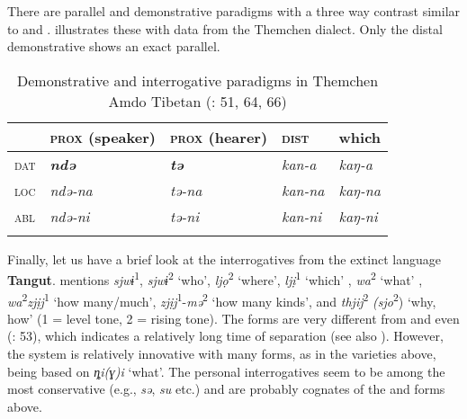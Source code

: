 There are parallel  and demonstrative paradigms with a three way contrast similar to  and .  illustrates these with data from the Themchen dialect. Only the distal demonstrative shows an exact parallel.

\begin{table}
\caption{Demonstrative and interrogative paradigms in Themchen Amdo Tibetan (\citealt{Haller2004}: 51, 64, 66)}
\label{tab:trans:13}

\begin{tabularx}{\textwidth}{XlXXl}
\lsptoprule
& \textbf{\textsc{prox}} \textbf{(speaker)} & \textbf{\textsc{prox}} \textbf{(hearer)} & \textbf{\textsc{dist}} & \textbf{which}\\
\midrule
\textsc{dat} & \textbf{\textit{ndə}} & \textbf{\textit{tə}} & \textit{kan-a} & \textit{kaŋ-a}\\
\textsc{loc} & \textit{ndə-na} & \textit{tə-na} & \textit{kan-na} & \textit{kaŋ-na}\\
\textsc{abl} & \textit{ndə-ni} & \textit{tə-ni} & \textit{kan-ni} & \textit{kaŋ-ni}\\
\lspbottomrule
\end{tabularx}
\end{table}

Finally, let us have a brief look at the interrogatives from the extinct language \textbf{Tangut}. \citet[617, passim]{Gong2003} mentions \textit{sjwɨ}\textsuperscript{1}, \textit{sjwɨ}\textsuperscript{2} ‘who’, \textit{ljọ}\textsuperscript{2} ‘where’, \textit{ljị}\textsuperscript{1} ‘which’ , \textit{wa}\textsuperscript{2} ‘what’ , \textit{wa}\textsuperscript{2}\textit{zjịj}\textsuperscript{1} ‘how many/much’, \textit{zjịj}\textsuperscript{1}-\textit{mə}\textsuperscript{2} ‘how many kinds’, and \textit{thjij}\textsuperscript{2} \textit{(sjo}\textsuperscript{2}) ‘why, how’ (1 = level tone, 2 = rising tone). The forms are very different from  and even  (\citealt{LaPollaHuang2003}: 53), which indicates a relatively long time of separation (see also \citealt{Chirkova2012}). However, the   system is relatively innovative with many forms, as in the  varieties above, being based on \textit{ȵi(ɣ)i} ‘what’. The  personal interrogatives seem to be among the most conservative (e.g.,  \textit{sə},  \textit{su} etc.) and are probably cognates of the  and  forms above.

\clearpage %